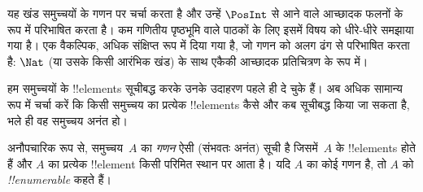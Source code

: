 \documentclass[../../../include/open-logic-section]{subfiles}
\begin{document}


\begin{editorial}
  यह खंड समुच्चयों के गणन पर चर्चा करता है और उन्हें $\PosInt$ से आने वाले
  आच्छादक फलनों के रूप में परिभाषित करता है। कम गणितीय पृष्ठभूमि वाले पाठकों
  के लिए इसमें विषय को धीरे-धीरे समझाया गया है। एक वैकल्पिक, अधिक संक्षिप्त
  रूप  में दिया गया है, जो गणन को अलग ढंग से परिभाषित
  करता है: $\Nat$ (या उसके किसी आरंभिक खंड) के साथ एकैकी आच्छादक प्रतिचित्रण
  के रूप में।
\end{editorial}

\begin{explain}
हम समुच्चयों के !!{element}s सूचीबद्ध करके उनके उदाहरण पहले ही दे चुके हैं।
अब अधिक सामान्य रूप में चर्चा करें कि किसी समुच्चय का प्रत्येक !!{element}s
कैसे और कब सूचीबद्ध किया जा सकता है, भले ही वह समुच्चय अनंत हो।
\end{explain}

\begin{defn}[गणन, अनौपचारिक रूप में]
अनौपचारिक रूप से, समुच्चय~$A$ का \emph{गणन} ऐसी (संभवतः अनंत) सूची है
जिसमें~$A$ के !!{element}s होते हैं और $A$ का प्रत्येक !!{element} किसी परिमित स्थान
पर आता है। यदि $A$ का कोई गणन है, तो $A$ को \emph{!!{enumerable}} कहते हैं।
\end{defn}
\end{document}
